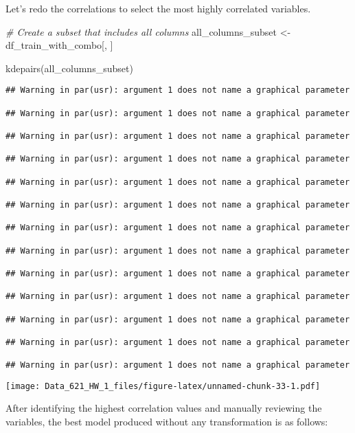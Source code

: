 \documentclass[
]{article}
\newenvironment{Shaded}{\begin{snugshade}}{\end{snugshade}}
\newcommand{\CommentTok}[1]{\textcolor[rgb]{0.56,0.35,0.01}{\textit{#1}}}
\newcommand{\FunctionTok}[1]{\textcolor[rgb]{0.00,0.00,0.00}{#1}}
\newcommand{\NormalTok}[1]{#1}
\newcommand{\OtherTok}[1]{\textcolor[rgb]{0.56,0.35,0.01}{#1}}
\begin{document}
Let's redo the correlations to select the most highly correlated
variables.

\begin{Shaded}
\begin{Highlighting}[]
\CommentTok{\# Create a subset that includes all columns}
\NormalTok{all\_columns\_subset }\OtherTok{\textless{}{-}}\NormalTok{ df\_train\_with\_combo[, ]}

\FunctionTok{kdepairs}\NormalTok{(all\_columns\_subset)}
\end{Highlighting}
\end{Shaded}

\begin{verbatim}
## Warning in par(usr): argument 1 does not name a graphical parameter

## Warning in par(usr): argument 1 does not name a graphical parameter

## Warning in par(usr): argument 1 does not name a graphical parameter

## Warning in par(usr): argument 1 does not name a graphical parameter

## Warning in par(usr): argument 1 does not name a graphical parameter

## Warning in par(usr): argument 1 does not name a graphical parameter

## Warning in par(usr): argument 1 does not name a graphical parameter

## Warning in par(usr): argument 1 does not name a graphical parameter

## Warning in par(usr): argument 1 does not name a graphical parameter

## Warning in par(usr): argument 1 does not name a graphical parameter

## Warning in par(usr): argument 1 does not name a graphical parameter

## Warning in par(usr): argument 1 does not name a graphical parameter

## Warning in par(usr): argument 1 does not name a graphical parameter
\end{verbatim}

\texttt{[image: Data\_621\_HW\_1\_files/figure-latex/unnamed-chunk-33-1.pdf]}

After identifying the highest correlation values and manually reviewing
the variables, the best model produced without any transformation is as
follows:
\end{document}
